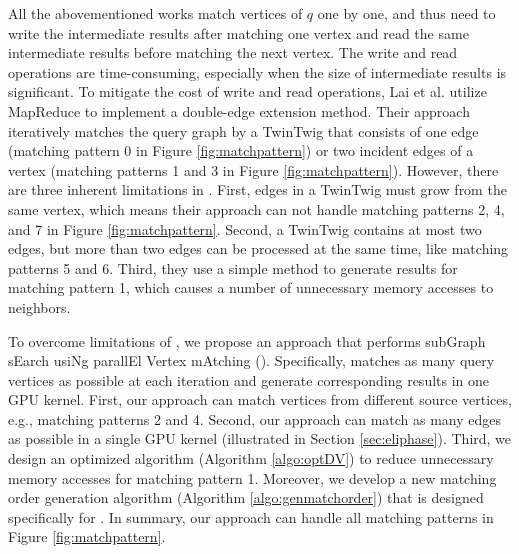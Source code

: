 All the abovementioned works match vertices of $q$ one by one, and thus need to write the intermediate results after matching one vertex and read the same intermediate results before matching the next vertex. The write and read operations are time-consuming, especially when the size of intermediate results is significant. To mitigate the cost of write and read operations, Lai et al. \cite{lai2015scalable} utilize MapReduce to implement a double-edge extension method. Their approach iteratively matches the query graph by a TwinTwig that consists of one edge (matching pattern 0 in Figure \ref{fig:matchpattern}) or two incident edges of a vertex (matching patterns 1 and 3 in Figure \ref{fig:matchpattern}). However, there are three inherent limitations in \cite{lai2015scalable}. First, edges in a TwinTwig must grow from the same vertex, which means their approach can not handle matching patterns 2, 4, and 7 in Figure \ref{fig:matchpattern}. Second, a TwinTwig contains at most two edges, but more than two edges can be processed at the same time, like matching patterns 5 and 6. Third, they use a simple method to generate results for matching pattern 1, which causes a number of unnecessary memory accesses to neighbors.

To overcome limitations of \cite{lai2015scalable}, we propose an approach that performs subGraph sEarch usiNg parallEl Vertex mAtching (\SystemName).  Specifically, \SystemName matches as many query vertices as possible at each iteration and generate corresponding results in one GPU kernel. First, our approach can match vertices from different source vertices, e.g., matching patterns 2 and 4. Second, our approach can match as many edges as possible in a single GPU kernel (illustrated in Section \ref{sec:eliphase}). Third, we design an optimized algorithm (Algorithm \ref{algo:optDV}) to reduce unnecessary memory accesses for matching pattern 1. Moreover, we develop a new matching order generation algorithm (Algorithm \ref{algo:genmatchorder}) that is designed specifically for \SystemName. In summary, our approach can handle all matching patterns in Figure \ref{fig:matchpattern}.


